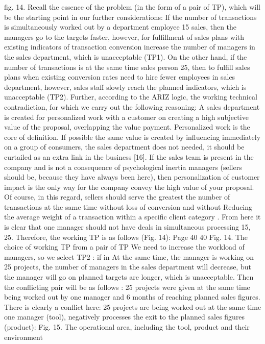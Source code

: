 fig. 14. Recall the essence of the problem (in the form of a pair of TP), which will be the starting point in
our further considerations:
If the number of transactions is simultaneously worked out by a department employee
15 sales, then the managers go to the targets faster, however, for
fulfillment of sales plans with existing indicators of transaction conversion
increase the number of managers in the sales department, which is unacceptable (TP1).
On the other hand, if the number of transactions is at the same time
sales person 25, then to fulfill sales plans when
existing conversion rates need to hire fewer employees in
sales department, however, sales staff slowly reach the planned
indicators, which is unacceptable (TP2).
Further, according to the ARIZ logic, the working
technical contradiction, for which we carry out the following reasoning:
A sales department is created for personalized work with a customer on
creating a high subjective value of the proposal, overlapping the value
payment. Personalized work is the core of definition. If possible
the same value is created by influencing immediately on a group of consumers, the sales department does not
needed, it should be curtailed as an extra link in the business [16]. If the sales team
is present in the company and is not a consequence of psychological inertia
managers (sellers should be, because they have always been here), then
personalization of customer impact is the only way for the company
convey the high value of your proposal.
Of course, in this regard, sellers should serve the greatest
the number of transactions at the same time without loss of conversion and without
Reducing the average weight of a transaction within a specific client category . From here
it is clear that one manager should not have deals in simultaneous processing
15, 25. Therefore, the working TP is as follows (Fig. 14):
Page 40
40
Fig. 14. The choice of working TP from a pair of TP
We need to increase the workload of managers, so we select TP2 : if in
At the same time, the manager is working on 25 projects, the number of
managers in the sales department will decrease, but the manager will go on
planned targets are longer, which is unacceptable.
Then the conflicting pair will be as follows :
25 projects were given at the same time being worked out by one manager and 6
months of reaching planned sales figures.
There is clearly a conflict here: 25 projects are being worked out at the same time
one manager (tool), negatively processes the exit to the planned
sales figures (product):
Fig. 15. The operational area, including the tool, product and their environment

